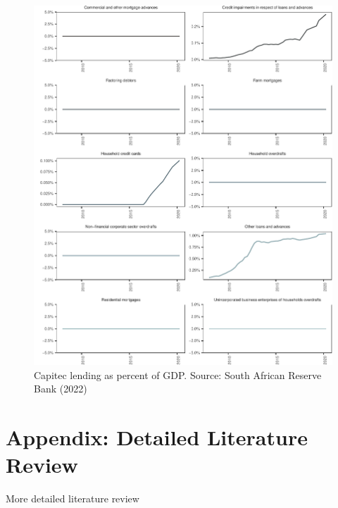 \documentclass[
]{article}
\begin{document}
\begin{figure}[H]

\includegraphics{Bank_capital_and_bank_lending_files/figure-latex/ba900gdpcapitec-1} \hfill{}

\caption{Capitec lending as percent of GDP. Source: South African Reserve Bank (2022)}\label{fig:ba900gdpcapitec}
\end{figure}

\newpage

\hypertarget{appendix-detailed-literature-review}{%
\section{Appendix: Detailed Literature Review}\label{appendix-detailed-literature-review}}

More detailed literature review

\newpage

\renewcommand\refname{References}
  
\end{document}
